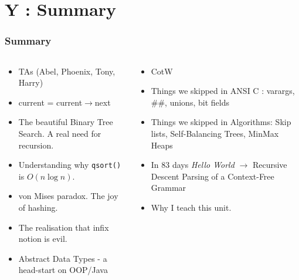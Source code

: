 \section{Y : Summary}
\label{chap:summary}


\begin{frame}[fragile]
\frametitle{Summary}
\begin{columns}[T]

\begin{column}{0.45\textwidth}
\begin{itemize}[<+->]
\item TAs (Abel, Phoenix, Tony, Harry)
\item current = current$\rightarrow$next
\item The beautiful Binary Tree Search. A real need for recursion.
\item Understanding why {\tt qsort()} is $O(n \log n)$.
\item von Mises paradox. The joy of hashing.
\item The realisation that infix notion is evil.
\item Abstract Data Types - a head-start on OOP/Java
\end{itemize}
\end{column}

\pause
\begin{column}{0.45\textwidth}
\begin{itemize}[<+->]
\item CotW
\item Things we skipped in ANSI C : varargs, $\#\#$, unions, bit fields
\item Things we skipped in Algorithms: Skip lists, Self-Balancing Trees, MinMax Heaps
\item In 83 days {\it Hello World} $\rightarrow$ Recursive Descent Parsing of a Context-Free Grammar
\item Why I teach this unit.
\end{itemize}
\end{column}

\end{columns}
\end{frame}
